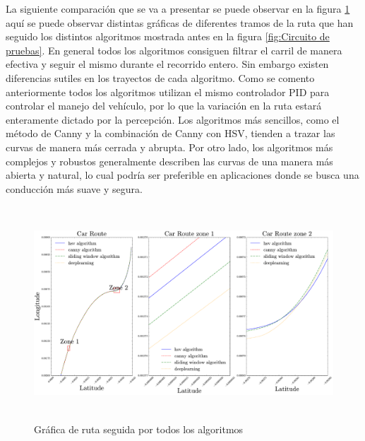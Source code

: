 \bigskip

La siguiente comparación que se va a presentar se puede observar en la figura \ref{fig:Gráfica de ruta seguida por todos los algoritmos} aquí se puede observar distintas gráficas de diferentes tramos de la  ruta que han seguido los distintos algoritmos mostrada antes en la figura \ref{fig:Circuito de pruebas}. En general todos los algoritmos consiguen filtrar el carril de manera efectiva y seguir el mismo durante el recorrido entero. Sin embargo existen diferencias sutiles en los trayectos de cada algoritmo. Como se comento anteriormente todos los algoritmos utilizan el mismo controlador \ac{PID} para controlar el manejo del vehículo, por lo que la variación en la ruta estará enteramente dictado por la percepción. Los algoritmos más sencillos, como el método de Canny y la combinación de Canny con HSV, tienden a trazar las curvas de manera más cerrada y abrupta. Por otro lado, los algoritmos más complejos y robustos generalmente describen las curvas de una manera más abierta y natural, lo cual podría ser preferible en aplicaciones donde se busca una conducción más suave y segura.

\bigskip

\begin{figure}[h]
    \centering
    \includegraphics[height=8cm]{imagenes/cap4/graphics_comparison/route.pdf}
    \caption{Gráfica de ruta seguida por todos los algoritmos}
    \label{fig:Gráfica de ruta seguida por todos los algoritmos}
\end{figure}

\bigskip

